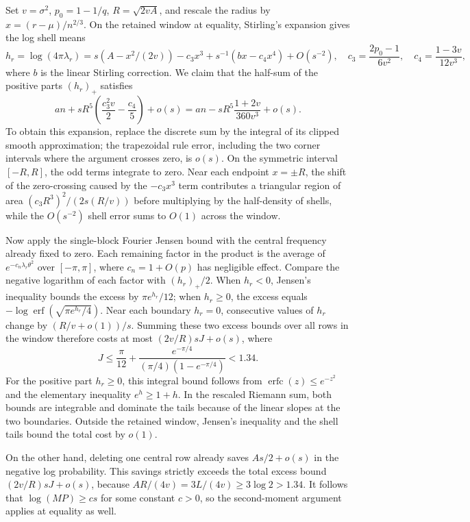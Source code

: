 Set \(v=\sigma^2\), \(p_0=1-1/q\), \(R=\sqrt{2vA}\), and rescale the radius by \(x=(r-\mu)/n^{2/3}\). On the retained window at equality, Stirling's expansion gives the log shell means
\[
 h_r=\log(4\pi\lambda_r)=s(A-x^2/(2v))-c_3x^3
       +s^{-1}(b x-c_4x^4)+O(s^{-2}),
 \quad c_3=\frac{2p_0-1}{6v^2},\quad
 c_4=\frac{1-3v}{12v^3},
\]
where \(b\) is the linear Stirling correction. We claim that the half-sum of the positive parts \((h_r)_+\) satisfies
\[
 an+sR^5\left(\frac{c_3^2v}{2}-\frac{c_4}{5}\right)+o(s)
 =an-sR^5\frac{1+2v}{360v^3}+o(s).
\]
To obtain this expansion, replace the discrete sum by the integral of its clipped smooth approximation; the trapezoidal rule error, including the two corner intervals where the argument crosses zero, is \(o(s)\). On the symmetric interval \([-R,R]\), the odd terms integrate to zero. Near each endpoint \(x=\pm R\), the shift of the zero-crossing caused by the \(-c_3x^3\) term contributes a triangular region of area \((c_3R^3)^2/(2s(R/v))\) before multiplying by the half-density of shells, while the \(O(s^{-2})\) shell error sums to \(O(1)\) across the window.

Now apply the single-block Fourier Jensen bound with the central frequency already fixed to zero. Each remaining factor in the product is the average of \(e^{-c_n\lambda_r\theta^2}\) over \([-\pi,\pi]\), where \(c_n=1+O(p)\) has negligible effect. Compare the negative logarithm of each factor with \((h_r)_+/2\). When \(h_r<0\), Jensen's inequality bounds the excess by \(\pi e^{h_r}/12\); when \(h_r\ge0\), the excess equals \(-\log\operatorname{erf}(\sqrt{\pi e^{h_r}/4})\). Near each boundary \(h_r=0\), consecutive values of \(h_r\) change by \((R/v+o(1))/s\). Summing these two excess bounds over all rows in the window therefore costs at most \((2v/R)sJ+o(s)\), where
\[
 J\le\frac{\pi}{12}+
     \frac{e^{-\pi/4}}{(\pi/4)(1-e^{-\pi/4})}<1.34 .
\]
For the positive part \(h_r\ge0\), this integral bound follows from \(\operatorname{erfc}(z)\le e^{-z^2}\) and the elementary inequality \(e^h\ge 1+h\). In the rescaled Riemann sum, both bounds are integrable and dominate the tails because of the linear slopes at the two boundaries. Outside the retained window, Jensen's inequality and the shell tails bound the total cost by \(o(1)\).

On the other hand, deleting one central row already saves \(As/2+o(s)\) in the negative log probability. This savings strictly exceeds the total excess bound \((2v/R)sJ+o(s)\), because \(AR/(4v)=3L/(4v)\ge3\log2>1.34\). It follows that \(\log(MP)\ge c s\) for some constant \(c>0\), so the second-moment argument applies at equality as well.

